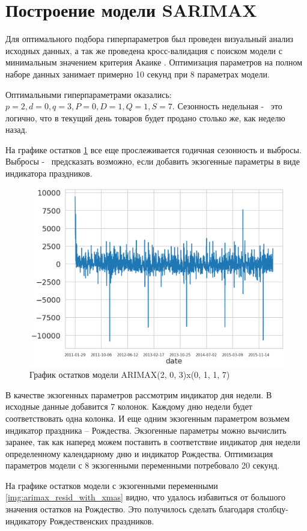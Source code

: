 \section{Построение модели SARIMAX}

Для оптимального подбора гиперпараметров был проведен
визуальный анализ исходных данных, а так же проведена
кросс-валидация с поиском модели с минимальным значением критерия Акаике \cite{akaike}.
Оптимизация параметров на полном наборе данных занимает примерно 10 секунд при 8 параметрах модели.

Оптимальными гиперпараметрами оказались:
$ p = 2, d = 0, q = 3, P = 0, D = 1, Q = 1, S = 7 $.
Сезонность недельная  -~ это логично, что в текущий день
товаров будет продано столько же, как неделю назад.

На графике остатков \ref{img:arimax_resid} все еще прослеживается
годичная сезонность и выбросы. Выбросы -~ предсказать возможно, если
добавить экзогенные параметры в виде индикатора праздников.

\def\figurename{Рис}
\begin{figure}[t]
	\centering
	\includegraphics[width=0.5\columnwidth]{./img/arimax_resid.png}
	\caption{График остатков модели ARIMAX(2, 0, 3)x(0, 1, 1, 7)}
	\label{img:arimax_resid}
\end{figure}

В качестве экзогенных параметров рассмотрим индикатор дня недели.
В исходные данные добавится 7 колонок. Каждому дню недели
будет соответствовать одна колонка. И еще одним экзогенным параметром
возьмем индикатор праздника -- Рождества.
Экзогенные параметры можно вычислить заранее, так как наперед можем
поставить в соответствие индикатор дня недели определенному календарному дню
и индикатор Рождества.
Оптимизация параметров модели с 8 экзогенными переменными потребовало 20 секунд.

На графике остатков модели с экзогенными переменными \ref{img:arimax_resid_with_xmas} видно, что удалось избавиться
от большого значения остатков на Рождество. Это получилось сделать благодаря
столбцу-индикатору Рождественских праздников.

